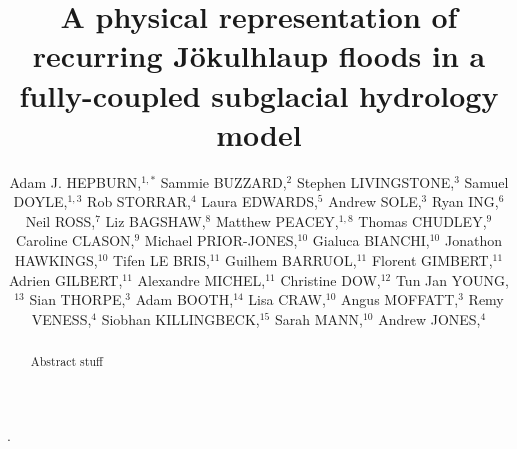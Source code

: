 \documentclass[review,jog]{igs}
\begin{document}
\title[Modelling recurring Jökulhlaup in 2D]{A physical representation of recurring Jökulhlaup floods in a fully-coupled subglacial hydrology model}.


\author[Hepburn and others]{Adam J. HEPBURN,$^{1,*}$
Sammie BUZZARD,$^{2}$
Stephen LIVINGSTONE,$^{3}$
Samuel DOYLE,$^{1,3}$
Rob STORRAR,$^{4}$
Laura EDWARDS,$^{5}$
Andrew SOLE,$^{3}$
Ryan ING,$^{6}$
Neil ROSS,$^{7}$
Liz BAGSHAW,$^{8}$
Matthew PEACEY,$^{1,8}$
Thomas CHUDLEY,$^{9}$
Caroline CLASON,$^{9}$
Michael PRIOR-JONES,$^{10}$
Gialuca BIANCHI,$^{10}$
Jonathon HAWKINGS,$^{10}$
Tifen LE BRIS,$^{11}$
Guilhem BARRUOL,$^{11}$
Florent GIMBERT,$^{11}$
Adrien GILBERT,$^{11}$
Alexandre MICHEL,$^{11}$
Christine DOW,$^{12}$
Tun Jan YOUNG,$^{13}$
Sian THORPE,$^{3}$
Adam BOOTH,$^{14}$
Lisa CRAW,$^{10}$
Angus MOFFATT,$^{3}$
Remy VENESS,$^{4}$
Siobhan KILLINGBECK,$^{15}$
Sarah MANN,$^{10}$
Andrew JONES,$^{4}$  
}


\begin{frontmatter}

\maketitle

\begin{abstract}
Abstract stuff
\end{abstract}

\end{frontmatter}
\end{document}
